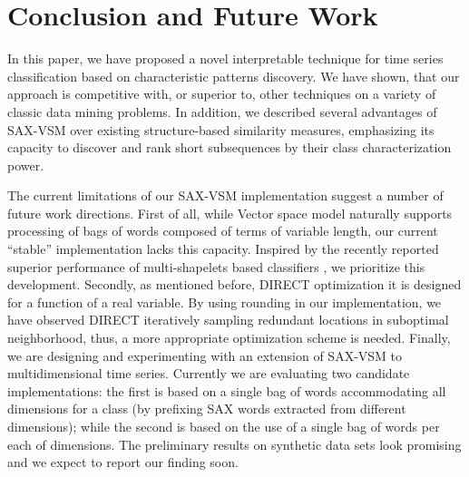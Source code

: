 \section{Conclusion and Future Work} \label{conclusion}
In this paper, we have proposed a novel interpretable technique for time series classification
based on characteristic patterns discovery. We have shown, that our approach is competitive with, 
or superior to, other techniques on a variety of classic data mining problems. In addition, 
we described several advantages of SAX-VSM over existing structure-based similarity measures,
emphasizing its capacity to discover and rank short subsequences by their class characterization
power.

The current limitations of our SAX-VSM implementation suggest a number of future work directions. 
First of all, while Vector space model naturally supports processing of bags of words composed 
of terms of variable length, our current ``stable'' implementation lacks this capacity.
Inspired by the recently reported superior performance of multi-shapelets based classifiers
\cite{citeulike:11345338}, we prioritize this development.
Secondly, as mentioned before, DIRECT optimization it is designed for a function of a real variable.
By using rounding in our implementation, we have observed DIRECT iteratively sampling redundant
locations in suboptimal neighborhood, thus, a more appropriate optimization scheme is needed.
Finally, we are designing and experimenting with an extension of SAX-VSM to multidimensional time
series. Currently we are evaluating two candidate implementations: the first is based on a
single bag of words accommodating all dimensions for a class (by prefixing SAX words extracted from
different dimensions); while the second is based on the use of a single bag of words per each of
dimensions. The preliminary results on synthetic data sets look promising and we expect to report 
our finding soon.
